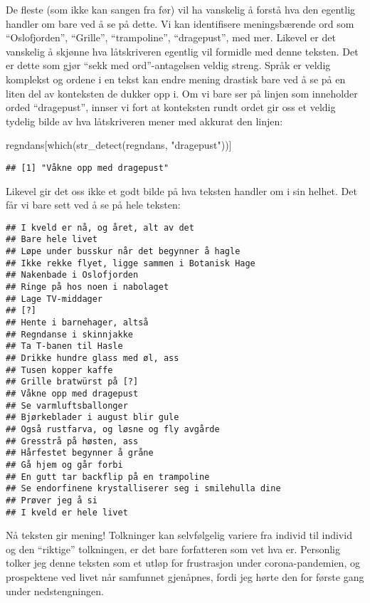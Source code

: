 \documentclass[
]{book}
\newenvironment{Shaded}{\begin{snugshade}}{\end{snugshade}}
\newcommand{\FunctionTok}[1]{\textcolor[rgb]{0.00,0.00,0.00}{#1}}
\newcommand{\NormalTok}[1]{#1}
\newcommand{\StringTok}[1]{\textcolor[rgb]{0.31,0.60,0.02}{#1}}
\begin{document}
De fleste (som ikke kan sangen fra før) vil ha vanskelig å forstå hva den egentlig handler om bare ved å se på dette. Vi kan identifisere meningsbærende ord som ``Oslofjorden'', ``Grille'', ``trampoline'', ``dragepust'', med mer. Likevel er det vanskelig å skjønne hva låtskriveren egentlig vil formidle med denne teksten. Det er dette som gjør ``sekk med ord''-antagelsen veldig streng. Språk er veldig komplekst og ordene i en tekst kan endre mening drastisk bare ved å se på en liten del av konteksten de dukker opp i. Om vi bare ser på linjen som inneholder orded ``dragepust'', innser vi fort at konteksten rundt ordet gir oss et veldig tydelig bilde av hva låtskriveren mener med akkurat den linjen:

\begin{Shaded}
\begin{Highlighting}[]
\NormalTok{regndans[}\FunctionTok{which}\NormalTok{(}\FunctionTok{str\_detect}\NormalTok{(regndans, }\StringTok{"dragepust"}\NormalTok{))]}
\end{Highlighting}
\end{Shaded}

\begin{verbatim}
## [1] "Våkne opp mеd dragepust"
\end{verbatim}

Likevel gir det oss ikke et godt bilde på hva teksten handler om i sin helhet. Det får vi bare sett ved å se på hele teksten:

\begin{verbatim}
## I kveld er nå, og året, alt av det
## Bare hele livet
## Løpe under busskur når det begynner å hagle
## Ikke rekke flyet, ligge sammen i Botanisk Hage
## Nakenbade i Oslofjorden
## Ringe på hos noen i nabolaget
## Lage TV-middager
## [?]
## Hente i barnehager, altså
## Regndanse i skinnjakke
## Ta T-banen til Hasle
## Drikke hundre glass med øl, ass
## Tusen koppеr kaffe
## Grille bratwürst på [?]
## Våkne opp mеd dragepust
## Se varmluftsballonger
## Bjørkeblader i august blir gule
## Også rustfarva, og løsne og fly avgårde
## Gresstrå på høsten, ass
## Hårfestet begynner å gråne
## Gå hjem og går forbi
## En gutt tar backflip på en trampoline
## Se endorfinene krystalliserer seg i smilehulla dine
## Prøver jeg å si
## I kveld er hele livet
\end{verbatim}

Nå teksten gir mening! Tolkninger kan selvfølgelig variere fra individ til individ og den ``riktige'' tolkningen, er det bare forfatteren som vet hva er. Personlig tolker jeg denne teksten som et utløp for frustrasjon under corona-pandemien, og prospektene ved livet når samfunnet gjenåpnes, fordi jeg hørte den for første gang under nedstengningen.
\end{document}
